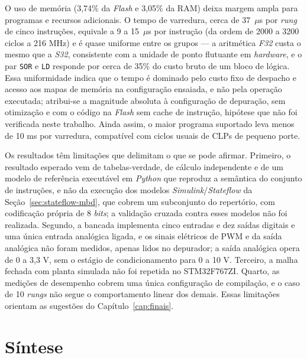 O uso de memória (3,74\% da \textit{Flash} e 3,05\% da RAM) deixa margem ampla para programas e recursos adicionais.
O tempo de varredura, cerca de 37~$\mu$s por \textit{rung} de cinco instruções, equivale a 9 a 15~$\mu$s por instrução (da ordem de 2000 a 3200 ciclos a 216 MHz) e é quase uniforme entre os grupos --- a aritmética \textit{F32} custa o mesmo que a \textit{S32}, consistente com a unidade de ponto flutuante em \textit{hardware}, e o par \texttt{SOR} e \texttt{LD} responde por cerca de 35\% do custo bruto de um bloco de lógica.
Essa uniformidade indica que o tempo é dominado pelo custo fixo de despacho e acesso aos mapas de memória na configuração ensaiada, e não pela operação executada; atribui-se a magnitude absoluta à configuração de depuração, sem otimização e com o código na \textit{Flash} sem cache de instrução, hipótese que não foi verificada neste trabalho.
Ainda assim, o maior programa suportado leva menos de 10 ms por varredura, compatível com ciclos usuais de CLPs de pequeno porte.

Os resultados têm limitações que delimitam o que se pode afirmar.
Primeiro, o resultado esperado vem de tabelas-verdade, de cálculo independente e de um modelo de referência executável em \textit{Python} que reproduz a semântica do conjunto de instruções, e não da execução dos modelos \textit{Simulink}/\textit{Stateflow} da Seção~\ref{sec:stateflow-mbd}, que cobrem um subconjunto do repertório, com codificação própria de 8 \textit{bits}; a validação cruzada contra esses modelos não foi realizada.
Segundo, a bancada implementa cinco entradas e dez saídas digitais e uma única entrada analógica ligada, e os sinais elétricos de PWM e da saída analógica não foram medidos, apenas lidos no depurador; a saída analógica opera de 0 a 3,3 V, sem o estágio de condicionamento para 0 a 10 V.
Terceiro, a malha fechada com planta simulada não foi repetida no STM32F767ZI.
Quarto, as medições de desempenho cobrem uma única configuração de compilação, e o caso de 10 \textit{rungs} não segue o comportamento linear dos demais.
Essas limitações orientam as sugestões do Capítulo~\ref{cap:finais}.

\section{Síntese}
\label{sec:sintese-implementacao}

